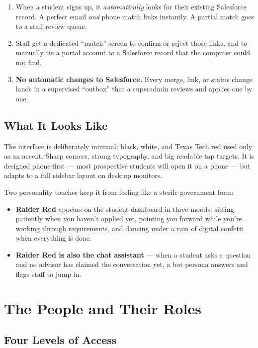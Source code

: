 \documentclass[11pt,letterpaper]{report}
\begin{document}
\begin{enumerate}[leftmargin=1.6em]
  \item When a student signs up, it \emph{automatically} looks for their
        existing Salesforce record. A perfect email \emph{and} phone match links
        instantly. A partial match goes to a staff review queue.
  \item Staff get a dedicated ``match'' screen to confirm or reject those links,
        and to manually tie a portal account to a Salesforce record that the
        computer could not find.
  \item \textbf{No automatic changes to Salesforce.} Every merge, link, or
        status change lands in a supervised ``outbox'' that a superadmin
        reviews and applies one by one.
\end{enumerate}

\section{What It Looks Like}

The interface is deliberately minimal: black, white, and Texas Tech red used
only as an accent. Sharp corners, strong typography, and big readable tap
targets. It is designed phone-first --- most prospective students will open it
on a phone --- but adapts to a full sidebar layout on desktop monitors.

Two personality touches keep it from feeling like a sterile government form:

\begin{itemize}[leftmargin=1.4em]
  \item \textbf{Raider Red} appears on the student dashboard in three moods:
        sitting patiently when you haven't applied yet, pointing you forward
        while you're working through requirements, and dancing under a rain of
        digital confetti when everything is done.
  \item \textbf{Raider Red is also the chat assistant} --- when a student asks a
        question and no advisor has claimed the conversation yet, a bot persona
        answers and flags staff to jump in.
\end{itemize}

\chapter{The People and Their Roles}

\section{Four Levels of Access}
\end{document}
